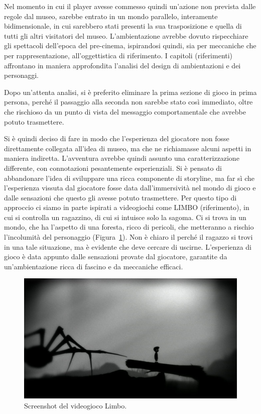 Nel momento in cui il player avesse commesso quindi un’azione non prevista dalle regole dal museo, sarebbe entrato in un mondo parallelo, interamente bidimensionale, in cui sarebbero stati presenti la sua trasposizione e quella di tutti gli altri visitatori del museo.
L’ambientazione avrebbe dovuto rispecchiare gli spettacoli dell’epoca del pre-cinema, ispirandosi quindi, sia per meccaniche che per rappresentazione, all’oggettistica di riferimento.
I capitoli (riferimenti) affrontano in maniera approfondita l’analisi del design di ambientazioni e dei personaggi.

Dopo un’attenta analisi, si è preferito eliminare la prima sezione di gioco in prima persona, perché il passaggio alla seconda non sarebbe stato così immediato, oltre che rischioso da un punto di vista del messaggio comportamentale che avrebbe potuto trasmettere.

Si è quindi deciso di fare in modo che l’esperienza del giocatore non fosse direttamente collegata all’idea di museo, ma che ne richiamasse alcuni aspetti in maniera indiretta.
L’avventura avrebbe quindi assunto una caratterizzazione differente, con connotazioni pesantemente esperienziali. Si è pensato di abbandonare l’idea di sviluppare una ricca componente di storyline, ma far sì che l’esperienza vissuta dal giocatore fosse data dall’immersività nel mondo di gioco e dalle sensazioni che questo gli avesse potuto trasmettere.
Per questo tipo di approccio ci siamo in parte ispirati a videogiochi come LIMBO (riferimento), in cui si controlla un ragazzino, di cui si intuisce solo la sagoma. Ci si trova in un mondo, che ha l’aspetto di una foresta, ricco di pericoli, che metteranno a rischio l’incolumità del personaggio (Figura~\ref{fig:level_design_limbo}). Non è chiaro il perché il ragazzo si trovi in una tale situazione, ma è evidente che deve cercare di uscirne. L’esperienza di gioco è data appunto dalle sensazioni provate dal giocatore, garantite da un’ambientazione ricca di fascino e da meccaniche efficaci.

\begin{figure}%
	\centering
	\includegraphics[width= 0.8\columnwidth]{images/gameDesign/38_limbo.jpg}
	\caption{Screenshot del videogioco Limbo.}
	\label{fig:level_design_limbo}
\end{figure}


